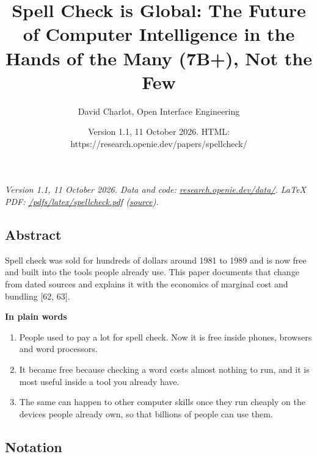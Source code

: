 \documentclass[
  10pt,
]{article}
\title{Spell Check is Global: The Future of Computer Intelligence in the
Hands of the Many (7B+), Not the Few}
\author{David Charlot, Open Interface Engineering}
\date{Version 1.1, 11 October 2026. HTML:
https://research.openie.dev/papers/spellcheck/}
\providecommand{\tightlist}{%
  \setlength{\itemsep}{0pt}\setlength{\parskip}{0pt}}
\begin{document}
\maketitle

{
\setcounter{tocdepth}{2}
\tableofcontents
}
\emph{Version 1.1, 11 October 2026. Data and code:
\href{https://research.openie.dev/data/\#economics}{research.openie.dev/data/}.
LaTeX PDF:
\href{https://research.openie.dev/pdfs/latex/spellcheck.pdf}{/pdfs/latex/spellcheck.pdf}
(\href{https://research.openie.dev/pdfs/latex/spellcheck.tex}{source}).}

\subsection{Abstract}\label{abstract}

Spell check was sold for hundreds of dollars around 1981 to 1989 and is
now free and built into the tools people already use. This paper
documents that change from dated sources and explains it with the
economics of marginal cost and bundling {[}62, 63{]}.

\textbf{In plain words}

\begin{enumerate}
\def\labelenumi{\arabic{enumi}.}
\tightlist
\item
  People used to pay a lot for spell check. Now it is free inside
  phones, browsers and word processors.
\item
  It became free because checking a word costs almost nothing to run,
  and it is most useful inside a tool you already have.
\item
  The same can happen to other computer skills once they run cheaply on
  the devices people already own, so that billions of people can use
  them.
\end{enumerate}

\subsection{Notation}\label{notation}
\end{document}
